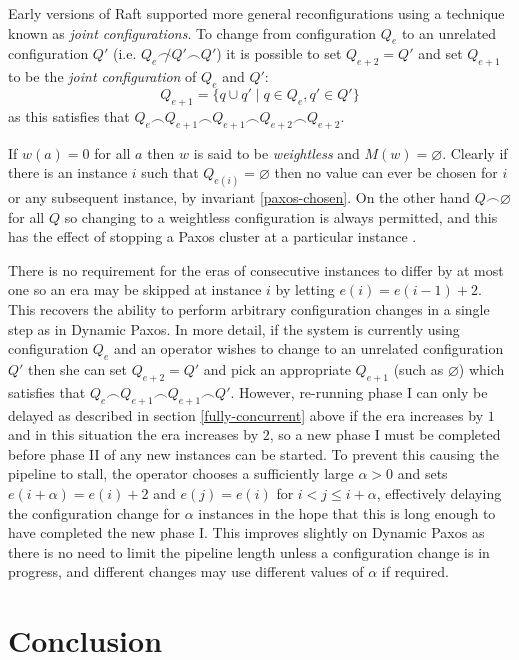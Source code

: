 \documentclass[journal]{IEEEtran}
\begin{document}
Early versions of Raft supported more general reconfigurations using a
technique known as \textit{joint configurations}. To change from configuration
$Q_{e}$ to an unrelated configuration $Q'$ (i.e.  $Q_{e} \not\frown Q' \frown
Q'$) it is possible to set $Q_{e+2} = Q'$ and set $Q_{e+1}$ to be the
\textit{joint configuration} of $Q_{e}$ and $Q'$: \[Q_{e+1} = \{ q \cup q' \mid
q \in Q_{e}, q' \in Q' \}\] as this satisfies that $Q_{e} \frown Q_{e + 1}
\frown Q_{e+1} \frown Q_{e + 2} \frown Q_{e + 2}$.

If $w(a) = 0$ for all $a$ then $w$ is said to be \textit{weightless} and $M(w)
= \varnothing$. Clearly if there is an instance $i$ such that $Q_{e(i)} =
\varnothing$ then no value can ever be chosen for $i$ or any subsequent
instance, by invariant \ref{paxos-chosen}. On the other hand $Q \frown
\varnothing$ for all $Q$ so changing to a weightless configuration is always
permitted, and this has the effect of stopping a Paxos cluster at a particular
instance \cite{reconfiguring-a-state-machine,stoppable-paxos}.

There is no requirement for the eras of consecutive instances to differ by at
most one so an era may be skipped at instance $i$ by letting $e(i) = e(i-1) +
2$.  This recovers the ability to perform arbitrary configuration changes in a
single step as in Dynamic Paxos. In more detail, if the system is currently
using configuration $Q_{e}$ and an operator wishes to change to an unrelated
configuration $Q'$ then she can set $Q_{e+2} = Q'$ and pick an appropriate
$Q_{e+1}$ (such as $\varnothing$) which satisfies that $Q_{e} \frown Q_{e + 1}
\frown Q_{e+1} \frown Q'$.  However, re-running phase I can only be delayed as
described in section \ref{fully-concurrent} above if the era increases by $1$
and in this situation the era increases by $2$, so a new phase I must be
completed before phase II of any new instances can be started.  To prevent this
causing the pipeline to stall, the operator chooses a sufficiently large
$\alpha > 0$ and sets $e(i+\alpha) = e(i)+2$ and $e(j) = e(i)$ for $i < j \le i
+ \alpha$, effectively delaying the configuration change for $\alpha$ instances
in the hope that this is long enough to have completed the new phase I. This
improves slightly on Dynamic Paxos as there is no need to limit the pipeline
length unless a configuration change is in progress, and different changes may
use different values of $\alpha$ if required.

\section{Conclusion}
\end{document}
